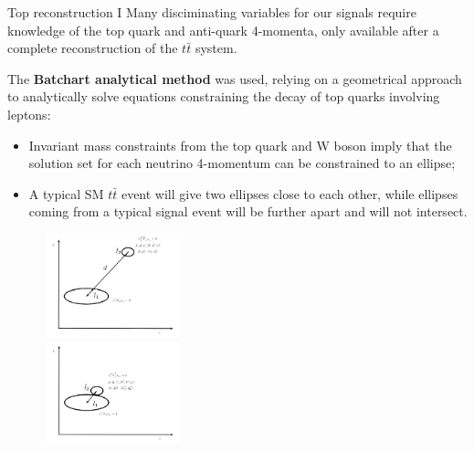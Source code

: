 \documentclass[8pt]{beamer}
\begin{document}
\begin{frame}{Top reconstruction I}
\justifying
Many disciminating variables for our signals require knowledge of the top quark and anti-quark 4-momenta, only available after a \alert{complete reconstruction of the $t \bar t$ system}. \vfill

The \textbf{Batchart analytical method} was used, relying on a geometrical approach to analytically solve equations constraining the decay of top quarks involving leptons:
\begin{itemize}
\justifying
\item Invariant mass constraints from the top quark and W boson imply that the solution set for each neutrino 4-momentum can be constrained to an ellipse;
\item A typical SM $t \bar t$ event will give two ellipses close to each other, while ellipses coming from a typical signal event will be further apart and will not intersect.
\end{itemize} \vfill

\begin{figure}[htbp]
\centering
\begin{minipage}[b]{.49\textwidth}
\begin{center}
\includegraphics[width=4cm, height=3cm]{figs/ElipseDM3.png}
\end{center}
\end{minipage}\hfill
\begin{minipage}[b]{.49\textwidth}
\begin{center}
\includegraphics[width=4cm, height=3cm]{figs/Elipsettnormal.png}
\end{center}
\end{minipage} \hfill
\label{fig:ellipsesDM}
\end{figure}
\end{frame}
\end{document}
